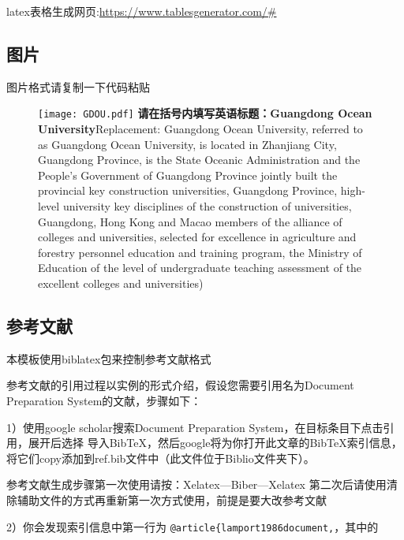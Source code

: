 latex表格生成网页:\url{https://www.tablesgenerator.com/#} 


\subsection{图片}
图片格式请复制一下代码粘贴
\begin{figure}[htbp]
	\centering
	\texttt{[image: GDOU.pdf]}
	{\textbf{请在括号内填写英语标题：Guangdong Ocean University}{\linebreak{}Replacement: Guangdong Ocean University, referred to as Guangdong Ocean University, is located in Zhanjiang City, Guangdong Province, is the State Oceanic Administration and the People's Government of Guangdong Province jointly built the provincial key construction universities, Guangdong Province, high-level university key disciplines of the construction of universities, Guangdong, Hong Kong and Macao members of the alliance of colleges and universities, selected for excellence in agriculture and forestry personnel education and training program, the Ministry of Education of the level of undergraduate teaching assessment of the excellent colleges and universities)}}
	\label{图片标签}
\end{figure}

\subsection{参考文献}
本模板使用biblatex包来控制参考文献格式

参考文献的引用过程以实例的形式介绍，假设您需要引用名为Document Preparation System的文献，步骤如下：

1）使用google scholar搜索Document Preparation System，在目标条目下点击引用，展开后选择 导入BibTeX，然后google将为你打开此文章的BibTeX索引信息，将它们copy添加到ref.bib文件中（此文件位于Biblio文件夹下）。

参考文献生成步骤第一次使用请按：Xelatex---Biber---Xelatex
第二次后请使用清除辅助文件的方式再重新第一次方式使用，前提是要大改参考文献

2）你会发现索引信息中第一行为 \verb|@article{lamport1986document,|，其中的 
	
